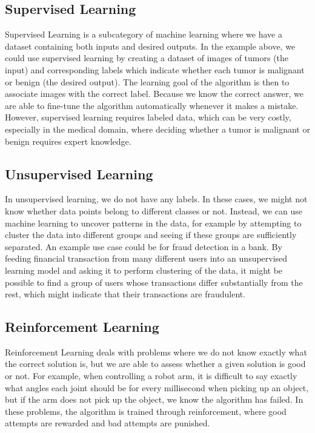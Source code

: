 \documentclass[UKenglish]{uiomasterthesis} %
\theoremstyle{definition}
\begin{document}
\subsection{Supervised Learning}

Supervised Learning is a subcategory of machine learning where we have a dataset containing both inputs and desired outputs. In the example above, we could use supervised learning by creating a dataset of images of tumors (the input) and corresponding labels which indicate whether each tumor is malignant or benign (the desired output). The learning goal of the algorithm is then to associate images with the correct label. Because we know the correct answer, we are able to fine-tune the algorithm automatically whenever it makes a mistake. However, supervised learning requires labeled data, which can be very costly, especially in the medical domain, where deciding whether a tumor is malignant or benign requires expert knowledge.

\subsection{Unsupervised Learning}

In unsupervised learning, we do not have any labels. In these cases, we might not know whether data points belong to different classes or not. Instead, we can use machine learning to uncover patterns in the data, for example by attempting to cluster the data into different groups and seeing if these groups are sufficiently separated. An example use case could be for fraud detection in a bank. By feeding financial transaction from many different users into an unsupervised learning model and asking it to perform clustering of the data, it might be possible to find a group of users whose transactions differ substantially from the rest, which might indicate that their transactions are fraudulent.

\subsection{Reinforcement Learning}

Reinforcement Learning deals with problems where we do not know exactly what the correct solution is, but we are able to assess whether a given solution is good or not. For example, when controlling a robot arm, it is difficult to say exactly what angles each joint should be for every millisecond when picking up an object, but if the arm does not pick up the object, we know the algorithm has failed. In these problems, the algorithm is trained through reinforcement, where good attempts are rewarded and bad attempts are punished.
\end{document}
